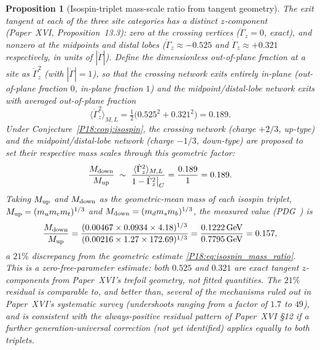 \documentclass[11pt,a4paper]{article}
\newtheorem{proposition}[theorem]{Proposition}
\theoremstyle{definition}\newtheorem{definition}[theorem]{Definition}
\theoremstyle{remark}
\begin{document}
\begin{proposition}[Isospin-triplet mass-scale ratio from tangent geometry]
\label{P18:prop:isospin_mass_ratio}
The exit tangent at each of the three site categories has a
distinct $z$-component (Paper~XVI, Proposition~13.3): %
zero at the crossing vertices ($\dot\Gamma_z=0$, exact), and nonzero
at the midpoints and distal lobes ($\dot\Gamma_z\approx-0.525$ and
$\dot\Gamma_z\approx+0.321$ respectively, in units of $|\dot\Gamma|$).
Define the dimensionless \emph{out-of-plane fraction} at a site as
$\dot\Gamma_z^2$ (with $|\dot\Gamma|=1$), so that the crossing
network exits entirely in-plane (out-of-plane fraction $0$, in-plane
fraction $1$) and the midpoint/distal-lobe network exits with
averaged out-of-plane fraction
\begin{equation}
  \langle\dot\Gamma_z^2\rangle_{M,L}
  = \tfrac12\bigl(0.525^2+0.321^2\bigr) = 0.189.
  \label{P18:eq:outofplane_avg}
\end{equation}
Under Conjecture~\ref{P18:conj:isospin}, the crossing network (charge
$+2/3$, up-type) and the midpoint/distal-lobe network (charge
$-1/3$, down-type) are proposed to set their respective mass scales
through this geometric factor:
\begin{equation}
  \frac{M_{\rm down}}{M_{\rm up}}
  \;\sim\;
  \frac{\langle\dot\Gamma_z^2\rangle_{M,L}}{1-\dot\Gamma_z^2\big|_{C}}
  = \frac{0.189}{1} = 0.189.
  \label{P18:eq:isospin_mass_ratio}
\end{equation}
Taking $M_{\rm up}$ and $M_{\rm down}$ as the geometric-mean mass
of each isospin triplet, $M_{\rm up}=(m_u m_c m_t)^{1/3}$ and
$M_{\rm down}=(m_d m_s m_b)^{1/3}$, the measured value
(PDG~\cite{PDG2024}) is
\begin{equation}
  \frac{M_{\rm down}}{M_{\rm up}}
  = \frac{(0.00467\times0.0934\times4.18)^{1/3}}
         {(0.00216\times1.27\times172.69)^{1/3}}
  = \frac{0.1222\,{\rm GeV}}{0.7795\,{\rm GeV}} = 0.157,
  \label{P18:eq:isospin_mass_ratio_obs}
\end{equation}
a $21\%$ discrepancy from the geometric estimate
\eqref{P18:eq:isospin_mass_ratio}.  This is a zero-free-parameter
estimate: both $0.525$ and $0.321$ are exact tangent
$z$-components from Paper~XVI's trefoil geometry, not fitted
quantities.  The $21\%$ residual is comparable to, and better than,
several of the mechanisms ruled out in Paper~XVI's systematic
survey (undershoots ranging from a factor of $1.7$ to $49$), and is
consistent with the always-positive residual pattern of Paper~XVI
\S12 if a further generation-universal correction (not yet
identified) applies equally to both triplets.
\end{proposition}
\end{document}
